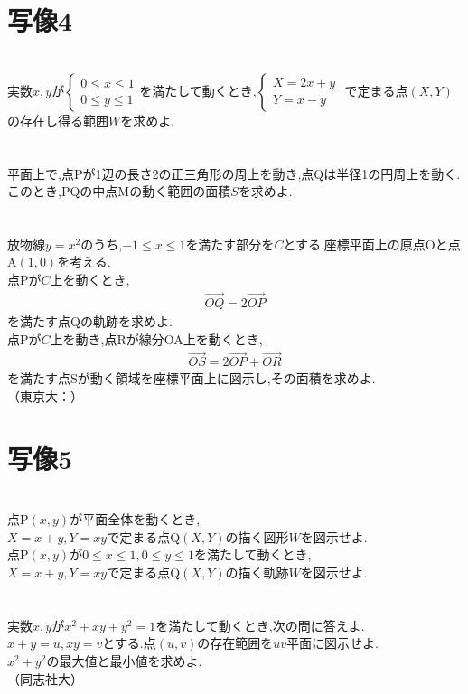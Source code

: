 \documentclass[10pt,fleqn,a4paper]{jsarticle}
\newcommand{\ans}[1]{\mbox{\boldmath{$#1$}}}
\begin{document}
\section{写像4}
\noindent{}\\
実数$x,y$が$\begin{cases}
    0\leq x\leq1\\
    0\leq y\leq1
\end{cases}$を満たして動くとき,$\begin{cases}
    X=2x+y\\
    Y=x-y
\end{cases}$
で定まる点$(X,Y)$の存在し得る範囲$W$を求めよ.\\\\
\\
平面上で,点Pが1辺の長さ2の正三角形の周上を動き,点Qは半径1の円周上を動く.このとき,PQの中点Mの動く範囲の面積$S$を求めよ.\\\\
\\
放物線$y=x^2$のうち,$-1\leq x\leq1$を満たす部分を$C$とする.座標平面上の原点Oと点A$(1,0)$を考える.\\
\kakkoichi 点Pが$C$上を動くとき,
\begin{align*}
    \Vec{OQ}=2\Vec{OP}
\end{align*}
を満たす点Qの軌跡を求めよ.\\
\kakkoni 点Pが$C$上を動き,点Rが線分OA上を動くとき,
\begin{align*}
    \Vec{OS}=2\Vec{OP}+\Vec{OR}
\end{align*}
を満たす点Sが動く領域を座標平面上に図示し,その面積を求めよ.\\
\hspace{10cm}（東京大：\ans{文理共通問題}）
\newpage
\section{写像5}
\noindent{}\\
\kakkoichi 点P$(x,y)$が平面全体を動くとき,\\$X=x+y,Y=xy$で定まる点Q$(X,Y)$の描く図形$W$を図示せよ.\\
\kakkoni 点P$(x,y)$が$0\leq x\leq1,0\leq y\leq1$を満たして動くとき,\\
$X=x+y,Y=xy$で定まる点Q$(X,Y)$の描く軌跡$W$を図示せよ.\\\\
\\
実数$x,y$が$x^2+xy+y^2=1$を満たして動くとき,次の問に答えよ.\\
\kakkoichi $x+y=u,xy=v$とする.点$(u,v)$の存在範囲を$uv$平面に図示せよ.\\
\kakkoni $x^2+y^2$の最大値と最小値を求めよ.\\
\hspace{10cm}（同志社大）
\newpage
\end{document}
